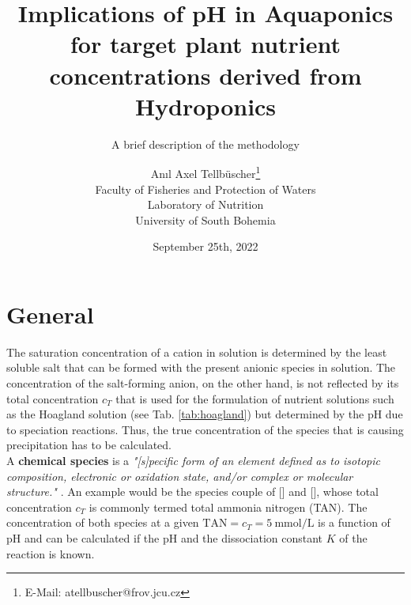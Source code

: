 \documentclass[11pt]{scrartcl}
\title{Implications of pH in Aquaponics for target plant nutrient concentrations derived from Hydroponics}
\subtitle{A brief description of the methodology}
\date{September 25th, 2022}
\author{An{\i}l Axel Tellb{\"u}scher\thanks{E-Mail: atellbuscher@frov.jcu.cz}\\ Faculty of Fisheries and Protection of Waters\\ Laboratory of Nutrition\\ University of South Bohemia}
\begin{document}
\maketitle

\section*{General}
The saturation concentration of a cation in solution is determined by the least soluble salt that can be formed with the present anionic species in solution. The concentration of the salt-forming anion, on the other hand, is not reflected by its total concentration $c_{T}$ that is used for the formulation of nutrient solutions such as the Hoagland solution (see Tab. \ref{tab:hoagland}) but determined by the pH due to speciation reactions. Thus, the true concentration of the species that is causing precipitation has to be calculated.\\
A \textbf{chemical species} is a \emph{"[s]pecific form of an element defined as to isotopic composition, electronic or oxidation state, and/or complex or molecular structure."} \parencite{IUPAC2019}. An example would be the species couple of [] and [], whose total concentration $c_{T}$ is commonly termed total ammonia nitrogen (TAN). The concentration of both species at a given $\text{TAN} = c_{T} = \SI{5}{\milli\mol\per\liter}$ is a function of pH and can be calculated if the pH and the dissociation constant $K$ of the reaction is known.
%
%
%
%
\end{document}
